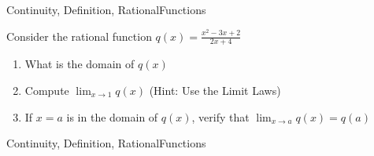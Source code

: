 \begin{tagblock}{Continuity, Definition, RationalFunctions}
\begin{question}
	
Consider the rational function $\displaystyle q(x)= \frac{x^2-3x+2}{2x+4}$
\begin{enumerate}
\item What is the domain of $q(x)$
\item Compute $\displaystyle \lim_{x \to 1} q(x)$ (Hint: Use the Limit Laws)
\item If $x=a$ is in the domain of $q(x)$, verify that  $\displaystyle \lim_{x \to a} q(x)=q(a)$
\end{enumerate}
	
\begin{tags}
	   Continuity, Definition, RationalFunctions
\end{tags}
	
\begin{diary}
	  
\end{diary}


	

	\end{question}
	
	\end{tagblock}






